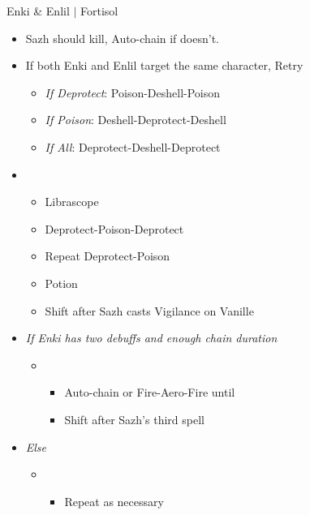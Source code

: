 \begin{battle}{Enki \& Enlil $|$ Fortisol}
\begin{multicols}{2}
\begin{itemize}
\begin{itemize}
              \item Sazh should kill, Auto-chain if doesn't.
            \end{itemize}
    \end{itemize}
    \columnbreak
    \begin{itemize}
      \item If both Enki and Enlil target the same character, Retry
            \begin{itemize}
              \item \textit{If Deprotect}: Poison-Deshell-Poison
              \item \textit{If Poison}: Deshell-Deprotect-Deshell
              \item \textit{If All}: Deprotect-Deshell-Deprotect
            \end{itemize}
      \item \second
            \begin{itemize}
              \item Librascope
              \item Deprotect-Poison-Deprotect
              \item Repeat Deprotect-Poison
              \item Potion
              \item Shift after Sazh casts Vigilance on Vanille
            \end{itemize}
      \item \textit{If Enki has two debuffs and enough chain duration}
            \begin{itemize}
              \item \fourth
                    \begin{itemize}
                      \item Auto-chain or Fire-Aero-Fire until \stagger
                      \item Shift after Sazh's third spell
                    \end{itemize}
            \end{itemize}
      \item \textit{Else}
            \begin{itemize}
              \item \fifth
                    \begin{itemize}
                      \item Repeat as necessary
                    \end{itemize}
            \end{itemize}

\end{itemize}
\end{multicols}
\end{battle}
